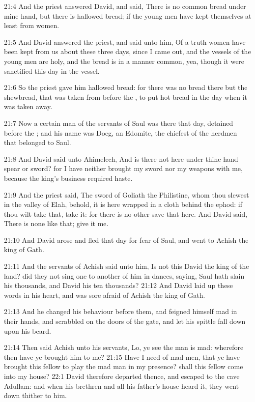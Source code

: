 21:4 And the priest answered David, and said, There is no common bread
under mine hand, but there is hallowed bread; if the young men have
kept themselves at least from women.

21:5 And David answered the priest, and said unto him, Of a truth
women have been kept from us about these three days, since I came out,
and the vessels of the young men are holy, and the bread is in a
manner common, yea, though it were sanctified this day in the vessel.

21:6 So the priest gave him hallowed bread: for there was no bread
there but the shewbread, that was taken from before the \LORD, to put
hot bread in the day when it was taken away.

21:7 Now a certain man of the servants of Saul was there that day,
detained before the \LORD; and his name was Doeg, an Edomite, the
chiefest of the herdmen that belonged to Saul.

21:8 And David said unto Ahimelech, And is there not here under thine
hand spear or sword? for I have neither brought my sword nor my
weapons with me, because the king's business required haste.

21:9 And the priest said, The sword of Goliath the Philistine, whom
thou slewest in the valley of Elah, behold, it is here wrapped in a
cloth behind the ephod: if thou wilt take that, take it: for there is
no other save that here. And David said, There is none like that; give
it me.

21:10 And David arose and fled that day for fear of Saul, and went to
Achish the king of Gath.

21:11 And the servants of Achish said unto him, Is not this David the
king of the land? did they not sing one to another of him in dances,
saying, Saul hath slain his thousands, and David his ten thousands?
21:12 And David laid up these words in his heart, and was sore afraid
of Achish the king of Gath.

21:13 And he changed his behaviour before them, and feigned himself
mad in their hands, and scrabbled on the doors of the gate, and let
his spittle fall down upon his beard.

21:14 Then said Achish unto his servants, Lo, ye see the man is mad:
wherefore then have ye brought him to me?  21:15 Have I need of mad
men, that ye have brought this fellow to play the mad man in my
presence? shall this fellow come into my house?  22:1 David therefore
departed thence, and escaped to the cave Adullam: and when his
brethren and all his father's house heard it, they went down thither
to him.

